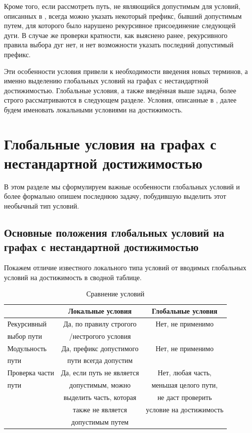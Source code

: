 Кроме того, если рассмотреть путь, не являющийся допустимым для условий, описанных в \cite{Mono}, всегда можно указать некоторый префикс, бывший допустимым путем, для которого было нарушено рекурсивное присоединение следующей дуги. В случае же проверки кратности, как выяснено ранее, рекурсивного правила выбора дуг нет, и нет возможности указать последний допустимый префикс.  

Эти особенности условия привели к необходимости введения новых терминов, а именно выделению глобальных условий на графах с нестандартной достижимостью. Глобальные условия, а также введённая выше задача, более строго рассматриваются в следующем разделе. Условия, описанные в \cite{Mono}, далее будем именовать локальными условиями на достижимость.

\section{Глобальные условия на графах с нестандартной достижимостью}

В этом разделе мы сформулируем важные особенности глобальных условий и более формально опишем последнюю задачу, побудившую выделить этот необычный тип условий. 

\subsection{Основные положения глобальных условий на графах с нестандартной достижимостью}

Покажем отличие известного локального типа условий от вводимых глобальных условий на достижимость в сводной таблице.

\begin{table}[h]
	\begin{tabular}{l | c | c }
		& Локальные условия & Глобальные условия \\
		\hline \hline
		Рекурсивный            & Да, по правилу строгого    & Нет, не применимо \\
		выбор пути			   & /нестрогого условия	    & \\
		\hline \hline
		Модульность            & Да, префикс допустимого    & Нет, не применимо \\
		пути			       & пути всегда допустим       & \\
		\hline \hline
		Проверка части         & Да, если путь не является  & Нет, любая часть, \\
		пути			       & допустимым, можно 			& меньшая целого пути, \\
		& выделить часть, которая    & не даст проверить \\
		& также не является      	& условие на достижимость \\
		& допустимым путем
	\end{tabular}
	\caption{Сравнение условий}
	\label{tabl:Compare}
\end{table}

